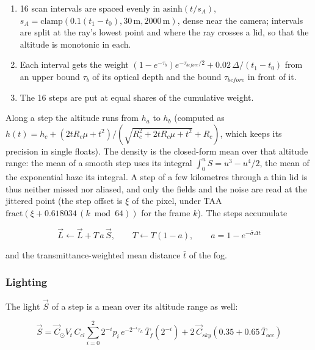 \documentclass[Orbiter Technical Reference.tex]{subfiles}
\begin{document}
\begin{sloppypar}
\begin{enumerate}
\item 16 scan intervals are spaced evenly in $\mathrm{asinh}(t/s_{A})$, $s_{A} = \mathrm{clamp}(0.1(t_{1} - t_{0}), 30\,\mathrm{m}, 2000\,\mathrm{m})$, dense near the camera; intervals are split at the ray's lowest point and where the ray crosses a lid, so that the altitude is monotonic in each.
\item Each interval gets the weight $(1 - e^{-\tau_{b}})e^{-\tau_{before}/2} + 0.02\,\Delta/(t_{1} - t_{0})$ from an upper bound $\tau_{b}$ of its optical depth and the bound $\tau_{before}$ in front of it.
\item The 16 steps are put at equal shares of the cumulative weight.
\end{enumerate}

\noindent
Along a step the altitude runs from $h_{a}$ to $h_{b}$ (computed as $h(t) = h_{c} + (2tR_{c}\mu + t^{2})/(\sqrt{R_{c}^{2} + 2tR_{c}\mu + t^{2}} + R_{c})$, which keeps its precision in single floats). The density is the closed-form mean over that altitude range: the mean of a smooth step uses its integral $\int_{0}^{u} S = u^{3} - u^{4}/2$, the mean of the exponential haze its integral. A step of a few kilometres through a thin lid is thus neither missed nor aliased, and only the fields and the noise are read at the jittered point (the step offset is $\xi$ of the pixel, under TAA $\mathrm{fract}(\xi + 0.618034\,(k \bmod 64))$ for the frame $k$). The steps accumulate

\[ \vec{L} \leftarrow \vec{L} + T\,a\,\vec{S}, \qquad T \leftarrow T(1 - a), \qquad a = 1 - e^{-\bar{\sigma}\Delta t} \]

\noindent
and the transmittance-weighted mean distance $\bar{t}$ of the fog.

\subsubsection{Lighting}
The light $\vec{S}$ of a step is a mean over its altitude range as well:

\[ \vec{S} = \vec{C}_{\odot}V_{t}\,C_{cl} \sum_{i=0}^{2} 2^{-i} p_{i}\, e^{-2^{-i}\tau_{h}}\, \bar{T}_{f}(2^{-i}) + 2\,\vec{C}_{sky}\left(0.35 + 0.65\,\bar{T}_{occ}\right) \]


\end{sloppypar}
\end{document}
